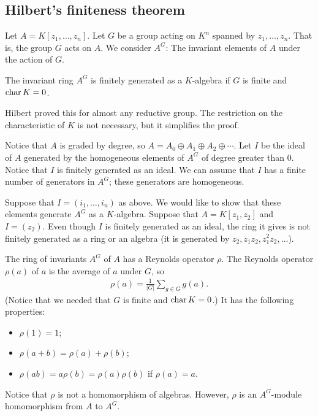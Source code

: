 \documentclass [11 pt, oneside] {article}
\begin{document}
\subsection{Hilbert's finiteness theorem}
Let $A = K[z_1,\hdots, z_n]$. Let $G$ be a group acting on $K^n$ spanned by $z_1,\hdots, z_n$. That is, the group $G$ acts on $A$. We consider $A^G$: The invariant elements of $A$ under the action of $G$.

\begin{theorem}[Hilbert]\label{}
The invariant ring $A^G$ is finitely generated as a $K$-algebra if $G$ is finite and $\operatorname{char} K = 0$.
\end{theorem}
\begin{remark}
	Hilbert proved this for almost any reductive group. The restriction on the characteristic of $K$ is not necessary, but it simplifies the proof.
\end{remark}

Notice that $A$ is graded by degree, so $A = A_0\oplus A_1\oplus A_2\oplus \cdots$. Let $I$ be the ideal of $A$ generated by the homogeneous elements of $A^G$ of degree greater than $0$. Notice that $I$ is finitely generated as an ideal. We can assume that $I$ has a finite number of generators in $A^G$; these generators are homogeneous. 

Suppose that $I=(i_1,\hdots,i_n)$ as above. We would like to show that these elements generate $A^G$ as a $K$-algebra. Suppose that $A=K[z_1,z_2]$ and $I = (z_2)$. Even though $I$ is finitely generated as an ideal, the ring it gives is not finitely generated as a ring or an algebra (it is generated by $z_2,z_1z_2, z_1^2z_2,\hdots$). 

The ring of invariants $A^G$ of $A$ has a Reynolds operator $\rho$. The Reynolds operator $\rho(a)$ of $a$ is the average of $a$ under $G$, so
\begin{align*}
	\rho(a) = \frac{1}{\left\lvert G \right\rvert } \sum_{g\in G}^{} g(a).
\end{align*}
(Notice that we needed that $G$ is finite and $\operatorname{char} K = 0$.) It has the following properties:
\begin{itemize}
	\item $\rho(1)=1$;
	\item $\rho(a+b) = \rho (a)+\rho (b)$;
	\item $\rho(ab) = a\rho (b)=\rho(a)\rho (b)$ if $\rho(a)=a$.
\end{itemize}
Notice that $\rho$ is not a homomorphism of algebras. However, $\rho$ is an $A^G$-module homomorphism from $A$ to $A^G$.
\end{document}
